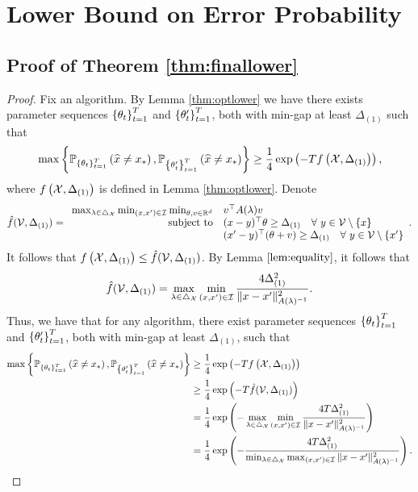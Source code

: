 \section{Lower Bound on Error Probability}\label{appendixlower}

\subsection{Proof of Theorem \ref{thm:finallower}}
\begin{proof}
    Fix an algorithm. By Lemma \ref{thm:optlower} we have there exists parameter sequences $\left\{\theta_t\right\}_{t=1}^T$ and $\left\{\theta_t'\right\}_{t=1}^T$, both with min-gap at least $\Delta_{(1)}$ such that \begin{equation}\max\left\{\mathbb{P}_{\left\{\theta_t\right\}_{t=1}^{T}}\left(\widehat{x}\neq x_*\right), \mathbb{P}_{\left\{\theta'_t\right\}_{t=1}^{T}}\left(\widehat{x}\neq x_*\right)\right\} \geq \frac{1}{4} \exp \left(- T f\left(\mathcal{X}, \Delta_{(1)}\right) \right),\end{equation}
where $f\left(\mathcal{X}, \Delta_{(1)}\right)$ is defined in Lemma \ref{thm:optlower}. Denote \begin{equation}\hat{f}(\mathcal{V}, \Delta_{(1)}) = \begin{array}{rl}
        \max_{\lambda\in\triangle_{\mathcal{X}}}\min_{(x, x')\in\mathcal{I}}\min_{\theta, v\in\mathbb{R}^d} & v^\top A(\lambda)v \\
        \mbox{\rm subject to} & (x - y)^\top\theta\geq \Delta_{(1)} \quad\forall~y \in \mathcal{V} \setminus \{x\}\\
    & (x' - y)^\top(\theta + v)\geq \Delta_{(1)}\quad\forall~ y \in \mathcal{V} \setminus \{x'\}
    \end{array}.\end{equation}
    It follows that $f\left(\mathcal{X}, \Delta_{(1)}\right) \leq \hat{f}(\mathcal{V}, \Delta_{(1)})$. By Lemma $\ref{lem:equality}$, it follows that \begin{equation}\hat{f}(\mathcal{V}, \Delta_{(1)}) = \max_{\lambda\in\triangle_{\mathcal{X}}}\min_{(x, x')\in\mathcal{I}} \frac{4\Delta_{(1)}^2}{\|x - x'\|^2_{A(\lambda)^{-1}}}.\end{equation} Thus, we have that for any algorithm, there exist parameter sequences $\left\{\theta_t\right\}_{t=1}^{T}$ and $\left\{\theta'_t\right\}_{t=1}^{T}$, both with min-gap at least $\Delta_{(1)}$, such that
\begin{align*}
    \max\left\{\mathbb{P}_{\left\{\theta_t\right\}_{t=1}^{T}}\left(\widehat{x}\neq x_*\right), \mathbb{P}_{\left\{\theta'_t\right\}_{t=1}^{T}}\left(\widehat{x}\neq x_*\right)\right\} &\geq \frac{1}{4} \exp \left(- T f\left(\mathcal{X}, \Delta_{(1)}\right) \right) \\
    &\geq \frac{1}{4} \exp \left(- T \hat{f}(\mathcal{V}, \Delta_{(1)}) \right) \\
    &=  \frac{1}{4} \exp \left(- \max_{\lambda\in\triangle_{\mathcal{X}}}\min_{(x, x')\in\mathcal{I}} \frac{4T\Delta_{(1)}^2}{\|x - x'\|^2_{A(\lambda)^{-1}}}\right)\\
    &= \frac{1}{4} \exp \left(-  \frac{4T\Delta_{(1)}^2}{\min_{\lambda\in\triangle_{\mathcal{X}}}\max_{(x, x')\in\mathcal{I}}\|x - x'\|^2_{A(\lambda)^{-1}}}\right).
\end{align*}
\end{proof}

